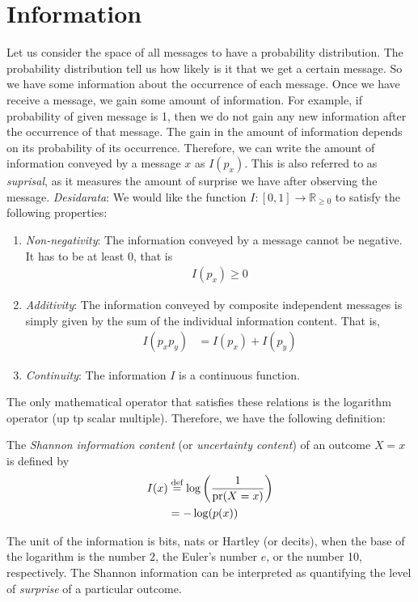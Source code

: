 \documentclass[a4paper, 12pt]{book} %
\begin{document}
\section{Information}
Let us consider the space of all messages to have a probability distribution. The probability distribution tell us how likely is it that we get a certain message. So we have some information about the occurrence of each message. Once we have receive a message, we gain some amount of information. For example, if probability of given message is 1, then we do not gain any new information after the occurrence of that message. The gain in the amount of information depends on its probability of its occurrence. Therefore, we can write the amount of information conveyed by a message $x$ as $I(p_x)$. This is also referred to as \emph{suprisal}, as it measures the amount of surprise we have after observing the message. \emph{Desidarata}: We would like the function $I: [0,1] \longrightarrow \mathbb{R}_{\geq 0}$ to satisfy the following properties:
\begin{enumerate}
    \item \emph{Non-negativity}: The information conveyed by a message cannot be negative. It has to be at least 0, that is
    \begin{align}
        I(p_x) \geq 0
    \end{align}
    \item \emph{Additivity}: The information conveyed by composite independent messages is simply given by the sum of the individual information content. That is,
    \begin{align}
        I(p_x p_y) &= I(p_x) + I(p_y)
    \end{align}
    \item \emph{Continuity}: The information $I$ is a continuous function.
\end{enumerate}


The only mathematical operator that satisfies these relations is the logarithm operator (up tp scalar multiple). Therefore, we have the following definition:
\begin{definition}
    The \emph{Shannon} \emph{information content} (or \emph{uncertainty content}) of an outcome $X = x$ is defined by
    \begin{align}
    I(x) &\overset{\text{def}}{=} \log\left(  \frac{1}{\operatorname{pr}(X = x)} \right) \\
    &= -\log(p(x))
    \end{align}
\end{definition}
The unit of the information is bits, nats or Hartley (or decits), when the base of the logarithm is the number $2$, the Euler's number $e$, or the number 10, respectively. The Shannon information can be interpreted as quantifying the level of \emph{surprise} of a particular outcome.
\end{document}
